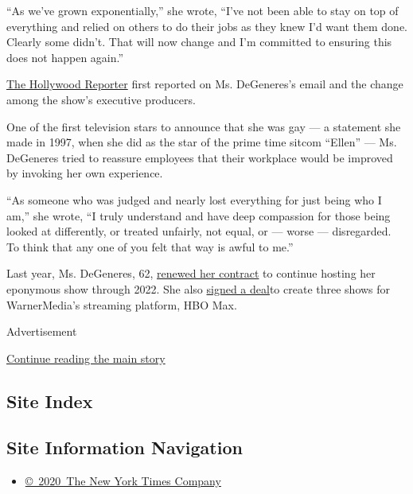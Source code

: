 ``As we've grown exponentially,'' she wrote, ``I've not been able to
stay on top of everything and relied on others to do their jobs as they
knew I'd want them done. Clearly some didn't. That will now change and
I'm committed to ensuring this does not happen again.''

\href{https://www.hollywoodreporter.com/live-feed/ellen-degeneres-addresses-workplace-allegations-changes-forthcoming-staff-letter-1305189?utm_source=Sailthru\&utm_medium=email\&utm_campaign=THR\%20Breaking\%20News_now_2020-07-30\%2014:15:33_lperez\&utm_term=hollywoodreporter_breakingnews}{The
Hollywood Reporter} first reported on Ms. DeGeneres's email and the
change among the show's executive producers.

One of the first television stars to announce that she was gay --- a
statement she made in 1997, when she did as the star of the prime time
sitcom ``Ellen'' --- Ms. DeGeneres tried to reassure employees that
their workplace would be improved by invoking her own experience.

``As someone who was judged and nearly lost everything for just being
who I am,'' she wrote, ``I truly understand and have deep compassion for
those being looked at differently, or treated unfairly, not equal, or
--- worse --- disregarded. To think that any one of you felt that way is
awful to me.''

Last year, Ms. DeGeneres, 62,
\href{https://www.nytimes.com/2018/12/12/arts/television/ellen-degeneres.html}{renewed
her contract} to continue hosting her eponymous show through 2022. She
also
\href{https://www.nytimes.com/2019/09/27/business/ellen-degeneres-hbo-max.html}{signed
a deal}to create three shows for WarnerMedia's streaming platform, HBO
Max.

Advertisement

\protect\hyperlink{after-bottom}{Continue reading the main story}

\hypertarget{site-index}{%
\subsection{Site Index}\label{site-index}}

\hypertarget{site-information-navigation}{%
\subsection{Site Information
Navigation}\label{site-information-navigation}}

\begin{itemize}
\tightlist
\item
  \href{https://help.nytimes.com/hc/en-us/articles/115014792127-Copyright-notice}{©~2020~The
  New York Times Company}
\end{itemize}

